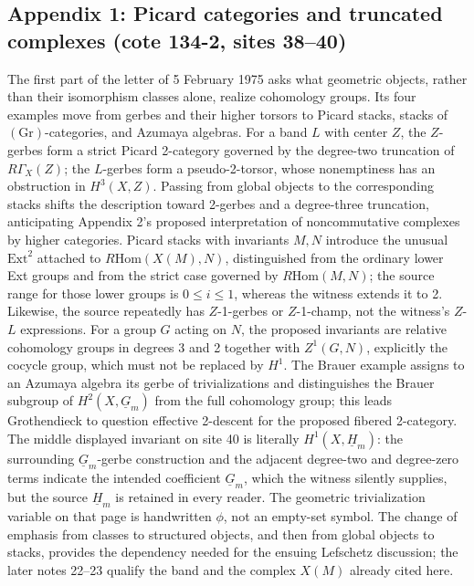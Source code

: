 \documentclass[10pt,oneside]{book}
\begin{document}
\subsection*{Appendix 1: Picard categories and truncated complexes (cote 134-2, sites 38--40)}
The first part of the letter of 5 February 1975 asks what geometric objects, rather than their isomorphism classes alone, realize cohomology groups. Its four examples move from gerbes and their higher torsors to Picard stacks, stacks of $(\mathrm{Gr})$-categories, and Azumaya algebras. For a band $L$ with center $Z$, the $Z$-gerbes form a strict Picard 2-category governed by the degree-two truncation of $R\Gamma_X(Z)$; the $L$-gerbes form a pseudo-2-torsor, whose nonemptiness has an obstruction in $H^3(X,Z)$. Passing from global objects to the corresponding stacks shifts the description toward 2-gerbes and a degree-three truncation, anticipating Appendix 2's proposed interpretation of noncommutative complexes by higher categories. Picard stacks with invariants $M,N$ introduce the unusual $\mathrm{Ext}^2$ attached to $R\mathrm{Hom}(X(M),N)$, distinguished from the ordinary lower Ext groups and from the strict case governed by $R\mathrm{Hom}(M,N)$; the source range for those lower groups is $0\leq i\leq1$, whereas the witness extends it to 2. Likewise, the source repeatedly has $Z$-1-gerbes or $Z$-1-champ, not the witness's $Z$-$L$ expressions. For a group $G$ acting on $N$, the proposed invariants are relative cohomology groups in degrees 3 and 2 together with $Z^1(G,N)$, explicitly the cocycle group, which must not be replaced by $H^1$. The Brauer example assigns to an Azumaya algebra its gerbe of trivializations and distinguishes the Brauer subgroup of $H^2(X,\underline G_m)$ from the full cohomology group; this leads Grothendieck to question effective 2-descent for the proposed fibered 2-category. The middle displayed invariant on site 40 is literally $H^1(X,\underline H_m)$: the surrounding $\underline G_m$-gerbe construction and the adjacent degree-two and degree-zero terms indicate the intended coefficient $\underline G_m$, which the witness silently supplies, but the source $\underline H_m$ is retained in every reader. The geometric trivialization variable on that page is handwritten $\phi$, not an empty-set symbol. The change of emphasis from classes to structured objects, and then from global objects to stacks, provides the dependency needed for the ensuing Lefschetz discussion; the later notes 22--23 qualify the band and the complex $X(M)$ already cited here.
\end{document}
